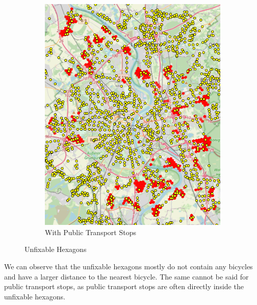 \begin{figure}
\begin{subfigure}[b]{0.30\textwidth}
         \includegraphics[width=\textwidth]{Figures/results/problematic_hexagons/unfixable_with_stops.png}
         \caption{With Public Transport Stops}
         \label{fig:unfixable_with_stops}
     \end{subfigure}
     \hfill
     \caption{Unfixable Hexagons}
     \label{fig:unfixable_hexagons}
\end{figure}
We can observe that the unfixable hexagons mostly do not contain any bicycles and have a larger distance to the nearest bicycle.
The same cannot be said for public transport stops, as public transport stops are often directly inside the unfixable hexagons.

